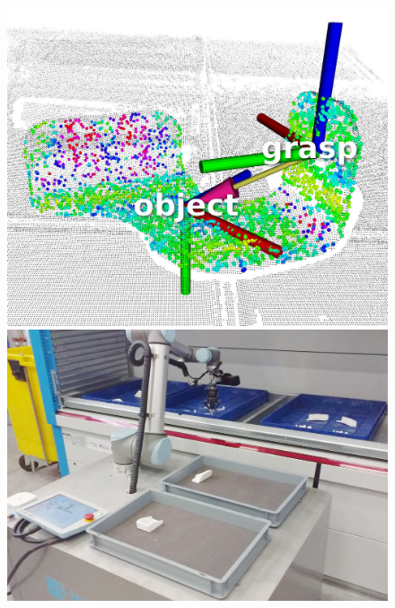 \begin{figure}[h!]
{\begin{tcolorbox}
	\includegraphics[height=.15\textheight]{Cap5/Figuras/picking_embraer/perception-3}
	\includegraphics[height=.15\textheight]{Cap5/Figuras/picking_embraer/back-3}

\end{tcolorbox}}
\end{figure}
